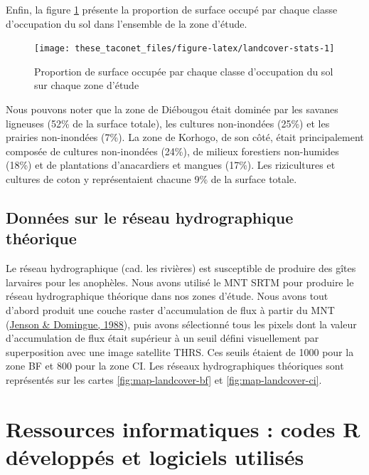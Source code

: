 \documentclass[12pt,twoside]{reedthesis}
\begin{document}
Enfin, la figure \ref{fig:landcover-stats} présente la proportion de surface occupé par chaque classe d'occupation du sol dans l'ensemble de la zone d'étude.
\begin{figure}

{\centering \texttt{[image: these\_taconet\_files/figure-latex/landcover-stats-1]} 

}

\caption[Proportion de surface occupée par chaque classe d'occupation du sol sur chaque zone d'étude]{Proportion de surface occupée par chaque classe d'occupation du sol sur chaque zone d'étude}\label{fig:landcover-stats}
\end{figure}
Nous pouvons noter que la zone de Diébougou était dominée par les savanes ligneuses (52\% de la surface totale), les cultures non-inondées (25\%) et les prairies non-inondées (7\%). La zone de Korhogo, de son côté, était principalement composée de cultures non-inondées (24\%), de milieux forestiers non-humides (18\%) et de plantations d'anacardiers et mangues (17\%). Les rizicultures et cultures de coton y représentaient chacune 9\% de la surface totale.

\hypertarget{hydro-data}{%
\subsection{Données sur le réseau hydrographique théorique}\label{hydro-data}}

Le réseau hydrographique (cad. les rivières) est susceptible de produire des gîtes larvaires pour les anophèles. Nous avons utilisé le MNT SRTM pour produire le réseau hydrographique théorique dans nos zones d'étude. Nous avons tout d'abord produit une couche raster d'accumulation de flux à partir du MNT (\protect\hyperlink{ref-jenson_extracting_1988}{Jenson \& Domingue, 1988}), puis avons sélectionné tous les pixels dont la valeur d'accumulation de flux était supérieur à un seuil défini visuellement par superposition avec une image satellite THRS. Ces seuils étaient de 1000 pour la zone BF et 800 pour la zone CI. Les réseaux hydrographiques théoriques sont représentés sur les cartes \ref{fig:map-landcover-bf} et \ref{fig:map-landcover-ci}.

\hypertarget{ressources-informatiques-codes-r-duxe9veloppuxe9s-et-logiciels-utilisuxe9s}{%
\section{Ressources informatiques : codes R développés et logiciels utilisés}\label{ressources-informatiques-codes-r-duxe9veloppuxe9s-et-logiciels-utilisuxe9s}}
\end{document}
